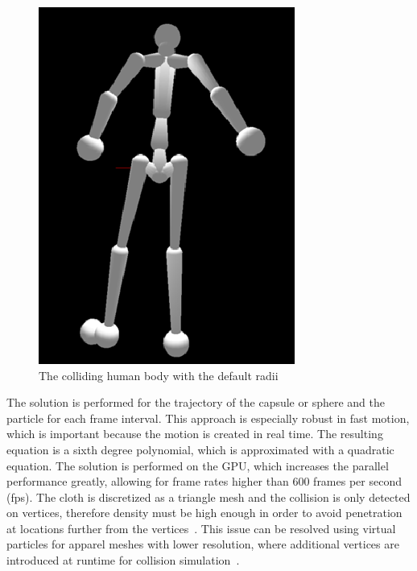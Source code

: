 \documentclass[number,preprint,review,12pt]{elsarticle}
\begin{document}
\begin{figure}[htbp]
	\begin{center}
	\includegraphics[width=0.75\textwidth]{colliders.eps}
	\end{center}
	\caption{The colliding human body with the default radii}
	\label{fig:colliders}
\end{figure}

The solution is performed for the trajectory of the capsule or sphere and the particle for each frame interval. This approach is especially robust in fast motion, which is important because the motion is created in real time. The resulting equation is a sixth degree polynomial, which is approximated with a quadratic equation. The solution is performed on the GPU, which increases the parallel performance greatly, allowing for frame rates higher than 600 frames per second (fps). The cloth is discretized as a triangle mesh and the collision is only detected on vertices, therefore density must be high enough in order to avoid penetration at locations further from the vertices~\cite{Kim2011,Tonge2010}. This issue can be resolved using virtual particles for apparel meshes with lower resolution, where additional vertices are introduced at runtime for collision simulation~\cite{Kim2011}.
\end{document}

